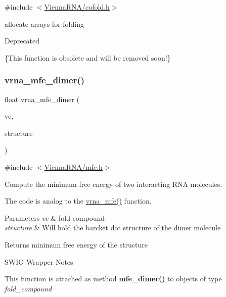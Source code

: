{\ttfamily \#include $<$\hyperlink{cofold_8h}{Vienna\+R\+N\+A/cofold.\+h}$>$}

allocate arrays for folding \begin{DoxyRefDesc}{Deprecated}
\item[\hyperlink{deprecated__deprecated000038}{Deprecated}]\{This function is obsolete and will be removed soon!\} \end{DoxyRefDesc}
\mbox{\label{group__mfe__cofold_gaab22d10c1190f205f16a77cab9d5d3ee}} 
\subsubsection{\texorpdfstring{vrna\+\_\+mfe\+\_\+dimer()}{vrna\_mfe\_dimer()}}
{\footnotesize\ttfamily float vrna\+\_\+mfe\+\_\+dimer (\begin{DoxyParamCaption}\item[{\hyperlink{group__fold__compound_ga1b0cef17fd40466cef5968eaeeff6166}{vrna\+\_\+fold\+\_\+compound\+\_\+t} $\ast$}]{vc,  }\item[{char $\ast$}]{structure }\end{DoxyParamCaption})}



{\ttfamily \#include $<$\hyperlink{mfe_8h}{Vienna\+R\+N\+A/mfe.\+h}$>$}



Compute the minimum free energy of two interacting R\+NA molecules. 

The code is analog to the \hyperlink{group__mfe__fold_gabd3b147371ccf25c577f88bbbaf159fd}{vrna\+\_\+mfe()} function.


\begin{DoxyParams}{Parameters}
{\em vc} & fold compound \\
\hline
{\em structure} & Will hold the barcket dot structure of the dimer molecule \\
\hline
\end{DoxyParams}
\begin{DoxyReturn}{Returns}
minimum free energy of the structure
\end{DoxyReturn}
\begin{DoxyRefDesc}{S\+W\+I\+G Wrapper Notes}
\item[\hyperlink{wrappers__wrappers000075}{S\+W\+I\+G Wrapper Notes}]This function is attached as method {\bfseries mfe\+\_\+dimer()} to objects of type {\itshape fold\+\_\+compound} \end{DoxyRefDesc}
